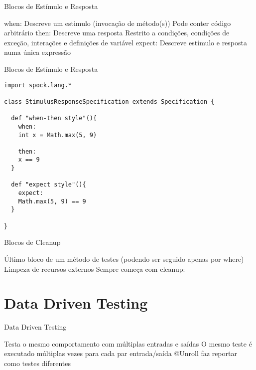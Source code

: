 \documentclass{beamer}
\begin{document}
\begin{frame}{Blocos de Estímulo e Resposta}
 \begin{outline}
    \alert{when:}
     Descreve um estimulo (invocação de método(s))
     Pode conter código arbitrário
    \alert{then:}
     Descreve uma resposta
     Restrito a condições, condições de exceção, interações e definições de variável
    \alert{expect:}
     Descreve estímulo e resposta numa única expressão
  \0
  \0
 \end{outline}
\end{frame}

\begin{frame}[fragile]{Blocos de Estímulo e Resposta}
 \begin{verbatim}
import spock.lang.*

class StimulusResponseSpecification extends Specification {

  def "when-then style"(){
    when:
    int x = Math.max(5, 9)
    
    then:
    x == 9
  }
  
  def "expect style"(){
    expect:
    Math.max(5, 9) == 9
  }
  
}
  \end{verbatim}
\end{frame}

\begin{frame}{Blocos de Cleanup}
 \begin{outline}
    Último bloco de um método de testes (podendo ser seguido apenas por where)
    Limpeza de recursos externos
    Sempre começa com \alert{cleanup:}
 \end{outline}
\end{frame}

\section{Data Driven Testing}

\begin{frame}{Data Driven Testing}
 \begin{outline}
    Testa o mesmo comportamento com múltiplas entradas e saídas
    O mesmo teste é executado múltiplas vezes para cada par entrada/saída
    @Unroll faz reportar como testes diferentes
 \end{outline}
\end{frame}
\end{document}
